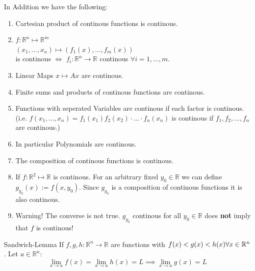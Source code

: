 \documentclass[a4paper,fontsize = 10pt]{article}
\def\R{\mathbb{R}}
\begin{document}
In Addition we have the following:
\begin{enumerate}
  \item Cartesian product of continous functions is continous.
  \item \(f: \R^n \mapsto \R^m\)\\
  \((x_1, \ldots, x_n) \mapsto (f_1(x),\ldots,f_m(x))\) \\is continous $\iff$ \(f_i: \R^n \to \R\) continous \(\forall i = 1, \ldots, m\).
  \item Linear Maps \(x \mapsto Ax\) are continous.
  \item Finite sums and products of continous functions are continous.
  \item Functions with seperated Variables are continous if each factor is continous. (i.e. $f(x_1,...,x_n) = f_1(x_1)f_2(x_2)\cdot...\cdot f_n(x_n)$ is continous if $f_1, f_2, ..., f_n$ are continous.)
  \item In particular Polynomials are continous.
  \item The composition of continous functions is continous.
  \item If $f: \R^2 \mapsto \R$ is continous. For an arbitrary fixed $y_0 \in \R$ we can define $g_{y_0}(x) := f(x, y_0)$. Since $g_{y_0}$ is a composition of continous functions it is also continous. 
  \item Warning! The converse is not true. $g_{y_0}$ continous for all $y_0 \in \R$ does \textbf{not} imply that  $f$ is continous!
\end{enumerate}
\begin{mainbox}{Sandwich-Lemma}
  If \(f, g, h: \R^n \to \R\) are functions with \(f(x) < g(x) < h(x) \\ \forall x \in \R^n\). Let $a \in \R^n$:
  \[\lim_{x\to a} f(x) = \lim_{x \to a} h(x) = L \implies \lim_{x\to a} g(x) = L\]
\end{mainbox}
\end{document}
